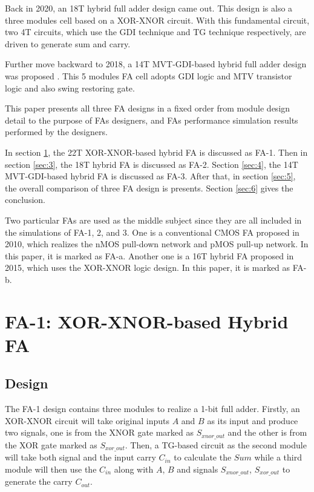 \documentclass[conference]{IEEEtran}
\begin{document}
Back in 2020, an 18T hybrid full adder design \cite{9339799} came out.
This design is also a three modules cell based on a XOR-XNOR circuit.
With this fundamental circuit, two 4T circuits, which use the GDI technique and TG technique respectively, are driven to generate sum and carry.

Further move backward to 2018, a 14T MVT-GDI-based hybrid full adder design was proposed \cite{18743001}.
This 5 modules FA cell adopts GDI logic and MTV transistor logic and also swing restoring gate.

This paper presents all three FA designs in a fixed order
from module design detail to the purpose of FAs designers, and FAs performance simulation results performed by the designers.

In section \ref{sec:2}, the 22T XOR-XNOR-based hybrid FA is discussed as FA-1.
Then in section \ref{sec:3}, the 18T hybrid FA is discussed as FA-2.
Section \ref{sec:4}, the 14T MVT-GDI-based hybrid FA is discussed as FA-3.
After that, in section \ref{sec:5}, the overall comparison of three FA design is presents.
Section \ref{sec:6} gives the conclusion.

Two particular FAs are used as the middle subject since they are all included in the simulations of FA-1, 2, and 3.
One is a conventional CMOS FA proposed in 2010\cite{weste2010cmos}, which realizes the nMOS pull-down network and pMOS pull-up network.
In this paper, it is marked as FA-a.
Another one is a 16T hybrid FA proposed in 2015\cite{15484823}, which uses the XOR-XNOR logic design.
In this paper, it is marked as FA-b.


\section{FA-1: XOR-XNOR-based Hybrid FA}
\label{sec:2}

\subsection{Design}

The FA-1 \cite{20212210429416} design contains three modules to realize a 1-bit full adder.
Firstly, an XOR-XNOR circuit will take original inputs \(A\) and \(B\) as its input and produce two signals,
one is from the XNOR gate marked as \(S_{xnor\_out}\) and the other is from the XOR gate marked as \( S_{xor\_out}\).
Then, a TG-based circuit as the second module will take both signal and the input carry \(C_{in}\) to calculate the \(Sum\)
while a third module will then use the \(C_{in}\) along with \(A\), \(B\) and signals \(S_{xnor\_out}\), \( S_{xor\_out}\) to generate the carry \(C_{out}\).
\end{document}
